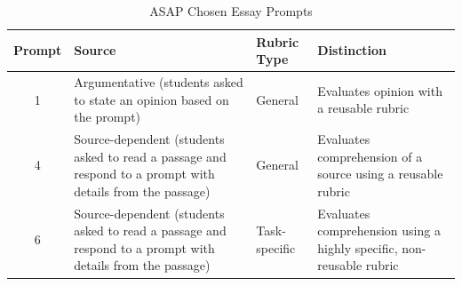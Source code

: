 
\begin{table}[]
    \centering
    \small
    \begin{tabular}{c >{\RaggedRight\arraybackslash}p{6cm} l >{\RaggedRight\arraybackslash}p{5cm}}
    \toprule
        \textbf{Prompt} & \textbf{Source} & \textbf{Rubric Type} & \textbf{Distinction} \\
        \midrule
        1 & Argumentative (students asked to state an opinion based on the prompt) & General & Evaluates opinion with a reusable rubric \\
        \midrule
        4 & Source-dependent (students asked to read a passage and respond to a prompt with details from the passage) & General & Evaluates comprehension of a source using a reusable rubric \\
        \midrule
        6 & Source-dependent (students asked to read a passage and respond to a prompt with details from the passage) & Task-specific & Evaluates comprehension using a highly specific, non-reusable rubric \\
        \bottomrule
    \end{tabular}
    \caption{ASAP Chosen Essay Prompts}
    \label{tab:asap_prompts}
\end{table}

